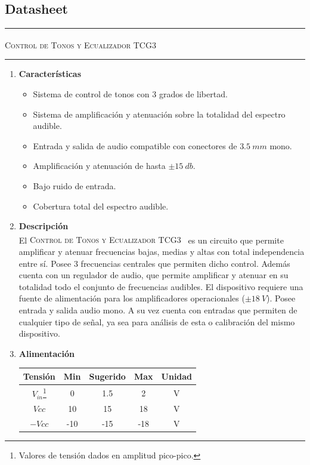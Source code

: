 \subsection{Datasheet}

\begin{center}
\rule{\textwidth}{1pt}
\textsc{Control de Tonos y Ecualizador TCG3 \textsuperscript{\textregistered}}
\rule{\textwidth}{1pt}
\end{center}

\begin{multicols}{2}

\begin{enumerate}
	\item[1] \textbf{Características}
	\begin{itemize}
		\item Sistema de control de tonos con 3 grados de libertad.
		\item Sistema de amplificación y atenuación sobre la totalidad del espectro audible.
		\item Entrada y salida de audio compatible con conectores de $3.5 \ mm$ mono.
		\item Amplificación y atenuación de hasta $\pm 15 \ db$.
		\item Bajo ruido de entrada.
		\item Cobertura total del espectro audible.
	\end{itemize}
	
	\item[2] \textbf{Descripción}\\
		El \textsc{Control de Tonos y Ecualizador TCG3~\textsuperscript{\textregistered}} es un circuito que permite amplificar y atenuar frecuencias bajas, medias y altas con total independencia entre sí. Posee 3 frecuencias centrales que permiten dicho control. Además cuenta con un regulador de audio, que permite amplificar y atenuar en su totalidad todo el conjunto de frecuencias audibles. El dispositivo requiere una fuente de alimentación para los amplificadores operacionales ($\pm 18 \ V$). Posee entrada y salida audio mono. A su vez cuenta con entradas que permiten de cualquier tipo de señal, ya sea para análisis de esta o calibración del mismo dispositivo.
	
	\item[3] \textbf{Alimentación}
	\begin{table}[H]
		\begin{tabular}{ccccc}
			\hline	
			Tensión & Min & Sugerido & Max & Unidad \\
			\hline
			$V_{in}$\footnote{Valores de tensión dados en amplitud pico-pico.}    & 0 	& 1.5		   & 2	 	& V \\
			$Vcc$       & 10  	& 15       & 18 	& V \\
			$-Vcc$      & -10 	& -15      & -18 	& V	\\
			\hline
		\end{tabular}
	\end{table}
		

\end{enumerate}
\end{multicols}
